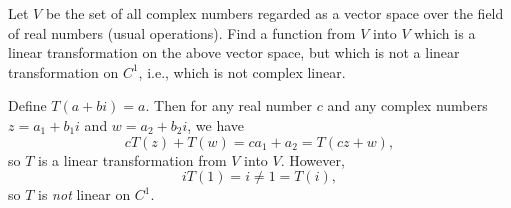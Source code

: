  Let $V$ be the set of all complex numbers regarded as a
vector space over the field of real numbers (usual operations). Find a
function from $V$ into $V$ which is a linear transformation on the
above vector space, but which is not a linear transformation on $C^1$,
i.e., which is not complex linear.
\begin{solution}
  Define $T(a + bi) = a$. Then for any real number $c$ and any
  complex numbers $z = a_1 + b_1i$ and $w = a_2 + b_2i$, we have
  \begin{equation*}
    cT(z) + T(w) = ca_1 + a_2 = T(cz + w),
  \end{equation*}
  so $T$ is a linear transformation from $V$ into $V$. However,
  \begin{equation*}
    iT(1) = i \neq 1 = T(i),
  \end{equation*}
  so $T$ is {\em not} linear on $C^1$.
\end{solution}
